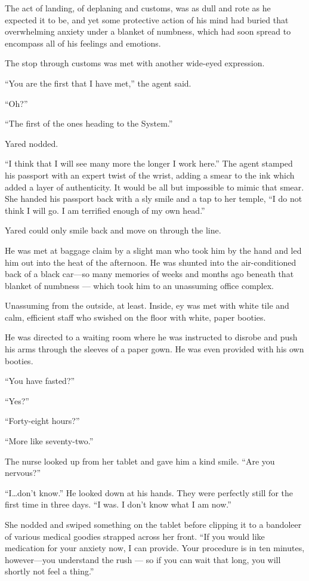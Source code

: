 The act of landing, of deplaning and customs, was as dull and rote as he expected it to be, and yet some protective action of his mind had buried that overwhelming anxiety under a blanket of numbness, which had soon spread to encompass all of his feelings and emotions.

The stop through customs was met with another wide-eyed expression.

``You are the first that I have met,'' the agent said.

``Oh?''

``The first of the ones heading to the System.''

Yared nodded.

``I think that I will see many more the longer I work here.'' The agent stamped his passport with an expert twist of the wrist, adding a smear to the ink which added a layer of authenticity. It would be all but impossible to mimic that smear. She handed his passport back with a sly smile and a tap to her temple, ``I do not think I will go. I am terrified enough of my own head.''

Yared could only smile back and move on through the line.

He was met at baggage claim by a slight man who took him by the hand and led him out into the heat of the afternoon. He was shunted into the air-conditioned back of a black car---so many memories of weeks and months ago beneath that blanket of numbness — which took him to an unassuming office complex.

Unassuming from the outside, at least. Inside, ey was met with white tile and calm, efficient staff who swished on the floor with white, paper booties.

He was directed to a waiting room where he was instructed to disrobe and push his arms through the sleeves of a paper gown. He was even provided with his own booties.

``You have fasted?''

``Yes?''

``Forty-eight hours?''

``More like seventy-two.''

The nurse looked up from her tablet and gave him a kind smile. ``Are you nervous?''

``I\ldots don't know.'' He looked down at his hands. They were perfectly still for the first time in three days. ``I was. I don't know what I am now.''

She nodded and swiped something on the tablet before clipping it to a bandoleer of various medical goodies strapped across her front. ``If you would like medication for your anxiety now, I can provide. Your procedure is in ten minutes, however---you understand the rush — so if you can wait that long, you will shortly not feel a thing.''

